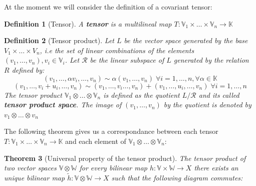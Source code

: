 \documentclass[11pt,a4paper,openright,oneside]{book}
\numberwithin{equation}{section}
\newtheorem{defn0}{Definition}[chapter]
\newtheorem{thm0}[defn0]{Theorem}
\newenvironment{definition}{ \begin{defn0}}{\end{defn0}}
\newenvironment{theorem}{\bigskip \begin{thm0}}{\end{thm0}}
\begin{document}
At the moment we will consider the definition of a covariant tensor:

\begin{definition}[Tensor]
    A \textbf{tensor} is a multilineal map ${T: \mathbb{V}_1 \times \dots \times \mathbb{V}_n \rightarrow \mathbb{K}}$
\end{definition}

\begin{definition}[Tensor product] Let $L$ be the vector space generated by the base ${V_1 \times \dots \times V_n}$, i.e the
    set of linear combinations of the elements $(v_1, \dots, v_n), v_i \in \mathbb{V}_i$. Let $\mathcal{R}$ be the linear subspace of
    $L$ generated by the relation $R$ defined by:
    $$(v_1, \dots, \alpha v_i, \dots, v_n) \sim \alpha(v_1, \dots, v_n) \; \forall i = 1, \dots, n, \forall \alpha \in \mathbb{K}$$
    $$(v_1, \dots, v_i + u_i, \dots, v_n) \sim (v_1, \dots, v_i \dots, v_n) + (v_1, \dots, u_i, \dots, v_n) \; \forall i = 1, \dots, n$$
    The tensor product $\mathbb{V}_1 \otimes \dots \otimes \mathbb{V}_n$ is defined as the quotient $L / \mathcal{R}$ and its called 
    \textbf{tensor product space}. The image of
    $(v_1, \dots, v_n)$ by the quotient is denoted by $v_1 \otimes \dots \otimes v_n$
\end{definition}

The following theorem gives us a correspondance between each tensor ${T: \mathbb{V}_1 \times \dots \times \mathbb{V}_n \rightarrow \mathbb{K}}$
and each element of $\mathbb{V}_1 \otimes \dots \otimes \mathbb{V}_n$:

\begin{theorem}[Universal property of the tensor product]
    The tensor product of two vector spaces $\mathbb{V} \otimes \mathbb{W}$
    for every bilinear map $h: \mathbb{V} \times \mathbb{W} \rightarrow X$ there exists an unique bilinear map $\tilde{h}: \mathbb{V} \otimes
    \mathbb{W} \rightarrow X$ such that the following diagram commutes:

    \centering

\end{theorem}
\end{document}
